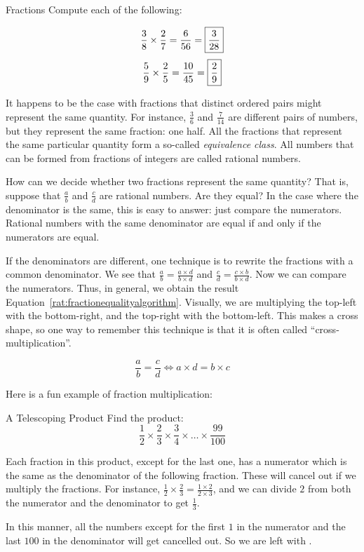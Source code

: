 \documentclass[a4paper,10pt]{report}
\begin{document}
\begin{problem}{Fractions}
 Compute each of the following:

 \[
         \frac{3}{8} \times \frac{2}{7} = \frac{6}{56} =
         \Ans{\displaystyle\frac{3}{28}}
        \]
 \[
  \frac{5}{9} \times \frac{2}{5} = \frac{10}{45} =
  \Ans{\displaystyle\frac{2}{9}}
  \]
\end{problem}

It happens to be the case with fractions that distinct ordered pairs might represent the
same quantity. For instance, \(\frac{3}{6}\) and \(\frac{7}{14}\) are different pairs of
numbers, but they represent the same fraction: one half. All the fractions that represent
the same particular quantity form a so-called \emph{equivalence class}. All numbers that can
be formed from fractions of integers are called \glspl{rational number}.

How can we decide whether two fractions represent the same quantity? That is, suppose that
\(\frac{a}{b}\) and \(\frac{c}{d}\) are rational numbers. Are they equal? In the case where
the denominator is the same, this is easy to answer: just compare the numerators. Rational
numbers with the same denominator are equal if and only if the numerators are equal.

If the denominators are different, one technique is to rewrite the fractions with a common
denominator. We see that \(\frac{a}{b} = \frac{a\times d}{b\times d}\) and \(\frac{c}{d} =
\frac{c\times b}{b\times d}\). Now we can compare the numerators. Thus, in general, we
obtain the result Equation~\ref{rat:fractionequalityalgorithm}. Visually, we are multiplying
the top-left with the bottom-right, and the top-right with the bottom-left. This makes a
cross shape, so one way to remember this technique is that it is often called
``cross-multiplication''.

\begin{equation}
  \frac{a}{b} = \frac{c}{d} \iff a\times d = b\times c
  \label{rat:fractionequalityalgorithm}
\end{equation}

Here is a fun example of fraction multiplication:

\begin{problem}{A Telescoping Product}
  Find the product:
  \[
    \frac{1}{2} \times \frac{2}{3} \times \frac{3}{4} \times
    \dots \times \frac{99}{100}
   \]

  \begin{solution}
    Each fraction in this product, except for the last one, has a numerator which is the
    same as the denominator of the following fraction. These will cancel out if we multiply
    the fractions. For instance, \(\frac{1}{2} \times \frac{2}{3} = \frac{1\times 2}{2
    \times 3}\), and we can divide \(2\) from both the numerator and the denominator to get
    \(\frac{1}{3}\).

    In this manner, all the numbers except for the first \(1\) in the numerator and the last
    \(100\) in the denominator will get cancelled out. So we are left with
    .
  \end{solution}
\end{problem}
\end{document}
